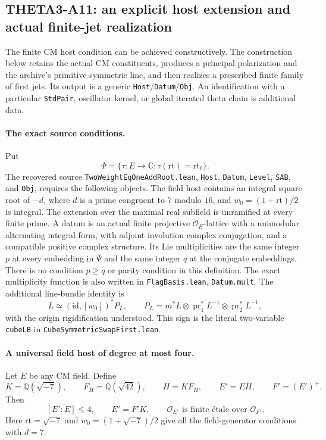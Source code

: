 \documentclass[11pt]{article}
\newcommand{\Q}{\mathbb Q}\newcommand{\C}{\mathbb C}\newcommand{\Z}{\mathbb Z}\newcommand{\R}{\mathbb R}\newcommand{\A}{\mathbb A}\newcommand{\OO}{\mathcal O}
\theoremstyle{definition}\newtheorem{definition}[theorem]{Definition}\newtheorem{remark}[theorem]{Remark}
\begin{document}
\subsection{THETA3-A11: an explicit host extension and actual finite-jet realization}
\label{A11}

The finite CM host condition can be achieved constructively.  The
construction below retains the actual CM constituents, produces a
principal polarization and the archive's primitive symmetric line,
and then realizes a prescribed finite family of first jets.  Its
output is a generic \texttt{Host}/\texttt{Datum}/\texttt{Obj}.  An
identification with a particular \texttt{StdPair}, oscillator kernel,
or global iterated theta chain is additional data.

\paragraph{The exact source conditions.}
Put
\[
 \Psi=\{\tau:E\longrightarrow\C:\tau(\mathrm{rt})=\mathrm{rt}_0\}.
\]
The recovered source
\nolinkurl{TwoWeightEqOneAddRoot.lean},
\texttt{Host}, \texttt{Datum}, \texttt{Level}, \texttt{SAB},
and \texttt{Obj}, requires the following objects.  The field host
contains an integral square root of $-d$, where $d$ is a prime
congruent to $7$ modulo $16$, and $w_0=(1+\mathrm{rt})/2$ is
integral.  The extension over the maximal real subfield is
unramified at every finite prime.  A datum is an actual finite
projective $\OO_E$-lattice with a unimodular alternating integral
form, with adjoint involution complex conjugation, and a compatible
positive complex structure.  Its Lie multiplicities are the same
integer $p$ at every embedding in $\Psi$ and the same integer $q$
at the conjugate embeddings.  There is no condition $p\geq q$ or
parity condition in this definition.  The exact multiplicity
function is also written in \texttt{FlagBasis.lean},
\texttt{Datum.mult}.  The additional line-bundle identity is
\[
       L\simeq(\mathrm{id},[w_0])^*P_L,\qquad
       P_L=m^*L\otimes\operatorname{pr}_1^*L^{-1}
                    \otimes\operatorname{pr}_2^*L^{-1},
 \tag{A11a}
\]
with the origin rigidification understood.  This sign is the
literal two-variable \texttt{cubeLB} in
\nolinkurl{CubeSymmetricSwapFirst.lean}.

\paragraph{A universal field host of degree at most four.}
Let $E$ be any CM field.  Define
\[
 K=\Q(\sqrt{-7}),\qquad F_H=\Q(\sqrt{42}),\qquad
 H=K F_H,\qquad E'=EH,\qquad F'=(E')^+.
 \tag{A11b}
\]
Then
\[
 [E':E]\leq4,\qquad
 E'=F'K,\qquad
 \OO_{E'}\text{ is finite \'etale over }\OO_{F'}.
 \tag{A11c}
\]
Here $\mathrm{rt}=\sqrt{-7}$ and $w_0=(1+\sqrt{-7})/2$ give
all the field-generator conditions with $d=7$.
\end{document}
